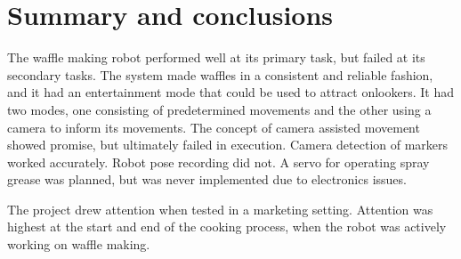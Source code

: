 \section{Summary and conclusions}
The waffle making robot performed well at its primary task, but failed at its secondary tasks. 
The system made waffles in a consistent and reliable fashion, and it had an entertainment mode that could be used to attract onlookers. It had two modes, one consisting of predetermined movements and the other using a camera to inform its movements.
The concept of camera assisted movement showed promise, but ultimately failed in execution. %
Camera detection of markers worked accurately. Robot pose recording did not. 
A servo for operating spray grease was planned, but was never implemented due to electronics issues. 

The project drew attention when tested in a marketing setting. Attention was highest at the start and end of the cooking process, when the robot was actively working on waffle making.

